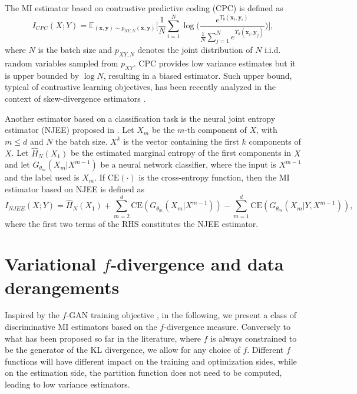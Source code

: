 The MI estimator based on contrastive predictive coding (CPC) \cite{NCE2018} is defined as 
\begin{equation}
\label{eq:MI_NCE}
I_{CPC}(X;Y) = \mathbb{E}_{(\mathbf{x},\mathbf{y})\sim p_{XY,N}(\mathbf{x},\mathbf{y})}\biggl[ \frac{1}{N} \sum_{i=1}^{N}{ \log\biggl( \frac{e^{T_{\theta}(\mathbf{x}_i,\mathbf{y}_i)}}{\frac{1}{N} \sum_{j=1}^{N}{e^{T_{\theta}(\mathbf{x}_i,\mathbf{y}_j)}}}\biggr)}  \biggr],
\end{equation}
where $N$ is the batch size and $p_{XY,N}$ denotes the joint distribution of $N$ i.i.d. random variables sampled from $p_{XY}$. CPC provides low variance estimates but it is upper bounded by $\log N$, resulting in a biased estimator. Such upper bound, typical of contrastive learning objectives, has been recently analyzed in the context of skew-divergence estimators \cite{RenyiCL}.

Another estimator based on a classification task is the neural joint entropy estimator (NJEE) proposed in \cite{shalev2022neural}.
Let $X_m$ be the $m$-th component of $X$, with $m\leq d$ and $N$ the batch size. $X^k$ is the vector containing the first $k$ components of $X$. Let $\hat{H}_N(X_1)$ be the estimated marginal entropy of the first components in $X$ and let $G_{\theta_m}(X_m|X^{m-1})$ be a neural network classifier, where the input is $X^{m-1}$ and the label used is $X_m$. If $\text{CE}(\cdot)$ is the cross-entropy function, then the MI estimator based on NJEE is defined as
\begin{equation}
    I_{NJEE}(X;Y) = \hat{H}_N(X_1) + \sum_{m=2}^{d} \text{CE}(G_{\theta_m}(X_m|X^{m-1})) - \sum_{m=1}^{d} \text{CE}(G_{\theta_m}(X_m|Y, X^{m-1})),
\end{equation}
where the first two terms of the RHS constitutes the NJEE estimator.

\section{Variational $f$-divergence and data derangements}
\label{sec:mi_f-DIME}

Inspired by the $f$-GAN training objective \cite{Nowozin2016}, in the following, we present a class of discriminative MI estimators based on the $f$-divergence measure. Conversely to what has been proposed so far in the literature, where $f$ is always constrained to be the generator of the KL divergence, we allow for any choice of $f$. Different $f$ functions will have different impact on the training and optimization sides, while on the estimation side, the partition function does not need to be computed, leading to low variance estimators.

